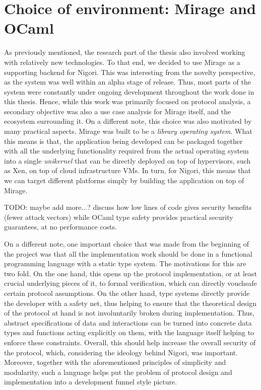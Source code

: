 \section{Choice of environment: Mirage and OCaml}
As previously mentioned, the research part of the thesis also involved working with relatively new technologies.
To that end, we decided to use Mirage as a supporting backend for Nigori.
This was interesting from the novelty perspective, as the system was well within an alpha stage of release.
Thus, most parts of the system were constantly under ongoing development throughout the work done in this thesis.
Hence, while this work was primarily focused on protocol analysis, a secondary objective was also a use case analysis for Mirage itself, and the ecosystem surrounding it.
On a different note, this choice was also motivated by many practical aspects.
Mirage was built to be a \textit{library operating system}.
What this means is that, the application being developed can be packaged together with all the underlying functionality required from the actual operating system into a single \textit{unikernel} that can be directly deployed on top of hypervisors, such as Xen, on top of cloud infrastructure VMs.
In turn, for Nigori, this means that we can target different platforms simply by building the application on top of Mirage.

TODO: maybe add more...? discuss how low lines of code gives security benefits (fewer attack vectors) while OCaml type safety provides practical security guarantees, at no performance costs.

On a different note, one important choice that was made from the beginning of the project was that all the implementation work should be done in a functional programming language with a static type system.
The motivations for this are two fold.
On the one hand, this opens up the protocol implementation, or at least crucial underlying pieces of it, to formal verification, which can directly vouchsafe certain protocol assumptions.
On the other hand, type systems directly provide the developer with a safety net, thus helping to ensure that the theoretical design of the protocol at hand is not involuntarily broken during implementation.
Thus, abstract specifications of data and interactions can be turned into concrete data types and functions acting explicitly on them, with the language itself helping to enforce these constraints.
Overall, this should help increase the overall security of the protocol, which, considering the ideology behind Nigori, was important.
Moreover, together with the aforementioned principles of simplicity and modularity, such a language helps put the problem of protocol design and implementation into a development funnel style picture.

